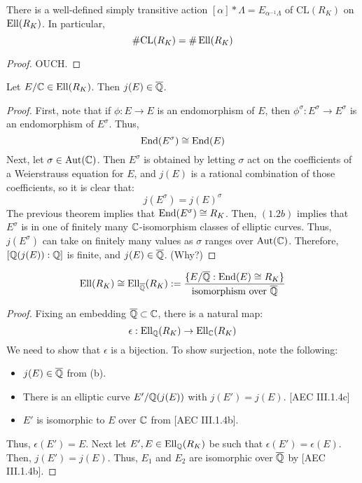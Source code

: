 \documentclass[12pt]{article}
\begin{document}
\begin{prop}
    There is a well-defined simply transitive action $[\alpha] \ast \Lambda = E_{\alpha^{-1}\Lambda}$ of $\text{CL}(R_K)$ on $\operatorname{Ell}(R_K)$. In particular, 
    \[ \#\text{CL}(R_K) = \#\operatorname{Ell}(R_K) \]
\end{prop}
\begin{proof}
    OUCH.
\end{proof}

\begin{lemma}
    Let $E/\mathbb C \in \operatorname{Ell}(R_K)$. Then $j(E) \in \overline{\mathbb Q}$. 
\end{lemma}
\begin{proof}
    First, note that if $\phi: E \to E$ is an endomorphism of $E$, then $\phi^\sigma: E^\sigma \to E^\sigma$ is an endomorphism of $E^\sigma$. Thus, \[ \operatorname{End}(E^\sigma) \cong \operatorname{End}(E)\] 
    Next, let $\sigma \in \operatorname{Aut}(\mathbb C)$. Then $E^\sigma$ is obtained by letting $\sigma$ act on the coefficients of a Weierstrauss equation for $E$, and $j(E)$ is a rational combination of those coefficients, so it is clear that: 
    \[ j(E^\sigma) = j(E)^\sigma\]
    The previous theorem implies that $\operatorname{End}(E^\sigma) \cong R_K$. Then, $(1.2b)$ implies that $E^\sigma$ is in one of finitely many $\mathbb C$-isomorphism classes of elliptic curves. Thus, $j(E^\sigma)$ can take on finitely many values as $\sigma$ ranges over $\operatorname{Aut}(\mathbb C)$. Therefore, $[\mathbb Q(j(E)):\mathbb Q]$ is finite, and $j(E) \in \overline{\mathbb Q}$. (Why?)
\end{proof}


\begin{theorem}
    \[\operatorname{Ell}(R_K) \cong \operatorname{Ell}_{\overline{\mathbb Q}}(R_K) := \frac{\{E/\overline{\mathbb Q} : \operatorname{End}(E) \cong R_K\}}{\text{isomorphism over $\overline{\mathbb Q}$}}\]
\end{theorem}

\begin{proof}
    Fixing an embedding $\overline{\mathbb Q} \subset \mathbb C$, there is a natural map: 
    \[ \epsilon : \operatorname{Ell}_\mathbb Q(R_K) \to \operatorname{Ell}_\mathbb C(R_K)\]
    We need to show that $\epsilon$ is a bijection. \bbni
    To show surjection, note the following: 
    \begin{itemize}
        \item $j(E) \in \overline{\mathbb Q}$ from (b). 
        \item There is an elliptic curve $E'/\mathbb Q(j(E))$ with $j(E') = j(E)$. [AEC III.1.4c]
        \item $E'$ is isomorphic to $E$ over $\mathbb C$ from [AEC III.1.4b].
    \end{itemize}
    Thus, $\epsilon(E') = E$. \bbni
    Next let $E', E \in \operatorname{Ell}_\mathbb Q(R_K)$ be such that $\epsilon(E') = \epsilon(E)$. Then, $j(E') = j(E)$. Thus, $E_1$ and $E_2$ are isomorphic over $\overline{\mathbb Q}$ by [AEC III.1.4b]. 
\end{proof}
\end{document}
